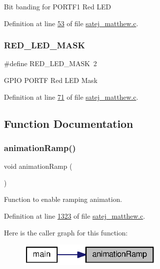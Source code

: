 Bit banding for P\+O\+R\+T\+F1 Red L\+ED 

Definition at line \mbox{\hyperlink{satej__matthew_8c_source_l00053}{53}} of file \mbox{\hyperlink{satej__matthew_8c_source}{satej\+\_\+matthew.\+c}}.

\mbox{\label{satej__matthew_8c_a2de27af622c55526783a345c21cec42e}} 
\subsubsection{\texorpdfstring{RED\_LED\_MASK}{RED\_LED\_MASK}}
{\footnotesize\ttfamily \#define R\+E\+D\+\_\+\+L\+E\+D\+\_\+\+M\+A\+SK~2}

G\+P\+IO P\+O\+R\+TF Red L\+ED Mask 

Definition at line \mbox{\hyperlink{satej__matthew_8c_source_l00071}{71}} of file \mbox{\hyperlink{satej__matthew_8c_source}{satej\+\_\+matthew.\+c}}.



\subsection{Function Documentation}
\mbox{\label{satej__matthew_8c_ae9ae5be10d7512aa7f78c8cc37cd8bb8}} 
\subsubsection{\texorpdfstring{animationRamp()}{animationRamp()}}
{\footnotesize\ttfamily void animation\+Ramp (\begin{DoxyParamCaption}{ }\end{DoxyParamCaption})}



Function to enable ramping animation. 



Definition at line \mbox{\hyperlink{satej__matthew_8c_source_l01323}{1323}} of file \mbox{\hyperlink{satej__matthew_8c_source}{satej\+\_\+matthew.\+c}}.

Here is the caller graph for this function\+:\nopagebreak
\begin{figure}[H]
\begin{center}
\leavevmode
\includegraphics[width=202pt]{satej__matthew_8c_ae9ae5be10d7512aa7f78c8cc37cd8bb8_icgraph}
\end{center}
\end{figure}
\mbox{\label{satej__matthew_8c_ae0e2b59e29ecdbadeb6bfa1a9efa5a85}} 
